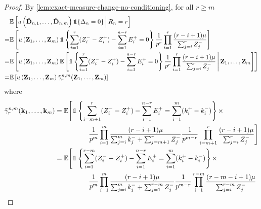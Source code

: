 \begin{proof}
    By \cref{lem:exact-measure-change-no-conditioning}, for all $r \geq m$
    \begin{align*}
        &\E \left[ 
            u\left( 
                \hat{\vD}_{n, 1}, \ldots, \hat{\vD}_{n, m}
             \right)
            \one\{\Delta_n = 0\}
            \, \middle\vert \,
            R_n = r
         \right] \\
        =&\E \left[ 
            u\left( \vZ_1, \ldots, \vZ_m \right)
            \one \left\{ 
                \sum_{i=1}^r (Z_i^- - Z_i^+) - \sum_{i=1}^{n-r} E_i^+ = 0
             \right\}
             \frac{1}{p^r} \prod_{i=1}^r \frac{(r - i + 1) \mu}{\sum_{j=i}^r Z_j^-}
         \right] \\
        =&\E \left[ 
            u\left( \vZ_1, \ldots, \vZ_m \right)
            \E \left[ 
                \one \left\{ 
                    \sum_{i=1}^r (Z_i^- - Z_i^+) - \sum_{i=1}^{n-r} E_i^+ = 0
                \right\}
                \frac{1}{p^r} \prod_{i=1}^r \frac{(r - i + 1) \mu}{\sum_{j=i}^r Z_j^-}
                \, \middle \lvert \,
                \vZ_1, \ldots, \vZ_m
             \right]
         \right] \\
        =&\E \left[ 
            u\left( \vZ_1, \ldots, \vZ_m \right)
            \tilde{\gamma}^{n, m}_r (\vZ_1, \ldots, \vZ_m)
         \right]
    \end{align*}
    where
    \begin{align*}
        \tilde{\gamma}^{n, m}_r (\vk_1, \ldots, \vk_m)
        &= \E \Bigg[ 
            \one \left\{ 
                \sum_{i=m+1}^r (Z_i^- - Z_i^+) - \sum_{i=1}^{n-r} E_i^+ = \sum_{i=1}^m (k_i^+ - k_i^-)
            \right\} \times \\
            &\hspace{5em}
            \frac{1}{p^m} \prod_{i=1}^m \frac{(r - i + 1) \mu}{\sum_{j=i}^m k_j^- + \sum_{j=m+1}^r Z_j^-}
            \frac{1}{p^{m-r}} \prod_{i=m+1}^r \frac{(r - i + 1) \mu}{\sum_{j=i}^r Z_j^-}
        \Bigg] \\
        &= \E \Bigg[ 
            \one \left\{ 
                \sum_{i=1}^{r-m} (Z_i^- - Z_i^+) - \sum_{i=1}^{n-r} E_i^+ = \sum_{i=1}^m (k_i^+ - k_i^-)
            \right\} \times \\
            &\hspace{5em}
            \frac{1}{p^m} \prod_{i=1}^m \frac{(r - i + 1) \mu}{\sum_{j=i}^m k_j^- + \sum_{j=1}^{r-m} Z_j^-}
            \frac{1}{p^{m-r}} \prod_{i=1}^{r-m} \frac{(r - m - i + 1) \mu}{\sum_{j=i}^{r-m} Z_j^-}

\end{align*}
\end{proof}
